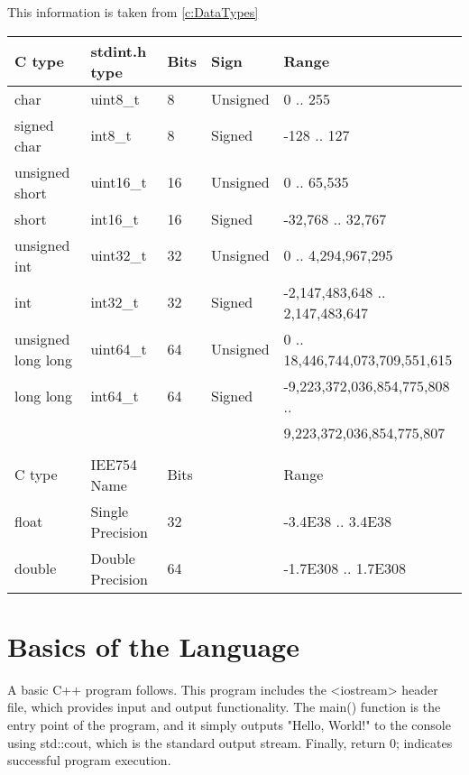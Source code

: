 \begin{fancybox}{}	
	This information is taken from \ref{c:DataTypes}
	\begin{center}
		\begin{tabular}{l|l|l|l|l}
			C type & stdint.h type & Bits & Sign & Range\\
			\hline
			char & uint8\_t & 8 & Unsigned & 0 .. 255 \\
			signed char & int8\_t & 8 & Signed & -128 .. 127 \\
			unsigned short & uint16\_t & 16 & Unsigned & 0 .. 65,535 \\
			short & int16\_t & 16 & Signed & -32,768 .. 32,767 \\
			unsigned int & uint32\_t & 32 & Unsigned & 0 .. 4,294,967,295 \\
			int & int32\_t & 32 & Signed & -2,147,483,648 .. 2,147,483,647 \\
			unsigned long long & uint64\_t & 64 & Unsigned & 0 .. 18,446,744,073,709,551,615 \\
			long long & int64\_t & 64 & Signed & -9,223,372,036,854,775,808 .. \\ & & & & \hspace{2em} 9,223,372,036,854,775,807 \\
			& & & & \\
			C type & IEE754 Name & Bits & & Range \\
			\hline
			float & Single Precision & 32 & & -3.4E38 .. 3.4E38 \\
			double & Double Precision & 64 & & -1.7E308 .. 1.7E308
		\end{tabular}
	\end{center}
\end{fancybox}













\section{Basics of the Language}

A basic C++  program follows. This program includes the <iostream> header file, which provides input and output functionality. The main() function is the entry point of the program, and it simply outputs "Hello, World!" to the console using std::cout, which is the standard output stream. Finally, return 0; indicates successful program execution.

